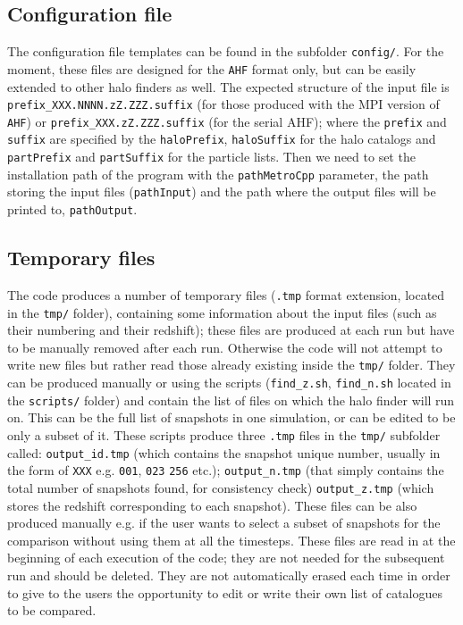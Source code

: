 \documentclass{article}
\begin{document}
\subsection{Configuration file}

The configuration file templates can be found in the subfolder \texttt{config/}. For the moment, these files are
designed for the \texttt{AHF} format only, but can be easily extended to other halo finders as well.
The expected structure of the input file is \texttt{prefix\_XXX.NNNN.zZ.ZZZ.suffix} (for those produced with the 
MPI version of \texttt{AHF}) or \texttt{prefix\_XXX.zZ.ZZZ.suffix} (for the serial AHF); where the \texttt{prefix} and
\texttt{suffix} are specified by the \texttt{haloPrefix}, \texttt{haloSuffix} for the halo catalogs and 
\texttt{partPrefix} and \texttt{partSuffix} for the particle lists.
Then we need to set the installation path of the program with the \texttt{pathMetroCpp} parameter, the path storing 
the input files (\texttt{pathInput}) and the path where the output files will be printed to, \texttt{pathOutput}.


\subsection{Temporary files}

The code produces a number of temporary files (\texttt{.tmp} format extension, located in the \texttt{tmp/} folder), containing
some information about the input files (such as their numbering and their redshift); these files are produced at each run but have
to be manually removed after each run. Otherwise the code will not attempt to write new files but rather read those already existing
inside the \texttt{tmp/} folder.
They can be produced manually or using the scripts (\texttt{find\_z.sh}, \texttt{find\_n.sh} located in the \texttt{scripts/} folder)
and contain the list of files on which the halo finder will run on.
This can be the full list of snapshots in one simulation, or can be edited to be only a subset of it.
These scripts produce three \texttt{.tmp} files in the \texttt{tmp/} subfolder called:
\texttt{output\_id.tmp} (which contains the snapshot unique number, usually in the form of \texttt{XXX} e.g. \texttt{001}, \texttt{023} 
\texttt{256} etc.); \texttt{output\_n.tmp} (that simply contains the total number of snapshots found, for consistency check)
\texttt{output\_z.tmp} (which stores the redshift corresponding to each snapshot).
These files can be also produced manually e.g. if the user wants to select a subset of snapshots for the comparison 
without using them at all the timesteps.
These files are read in at the beginning of each execution of the code; they are not needed for the subsequent run and 
should be deleted. They are not automatically erased each time in order to give to the users the opportunity to
edit or write their own list of catalogues to be compared.
\end{document}
